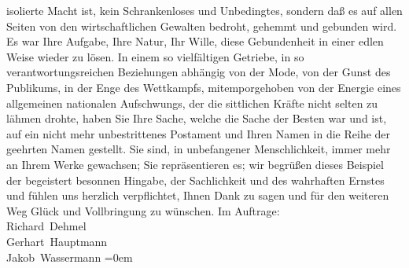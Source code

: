 \begin{ledgroupsized}[t]{13cm}
               isolierte Macht ist, kein Schrankenloses und Unbedingtes, sondern daß es auf allen
               Seiten von den wirtschaftlichen Gewalten bedroht, gehemmt und gebunden wird. Es war
               Ihre Aufgabe, Ihre Natur, Ihr Wille, {\pb}diese Gebundenheit in einer edlen Weise wieder zu lösen. In einem so vielfältigen
               Getriebe, in so verantwortungsreichen Beziehungen abhängig von der Mode, von der
               Gunst des Publikums, in der Enge des Wettkampfs, mitemporgehoben von der Energie
               eines allgemeinen nationalen Aufschwungs, der die sittlichen Kräfte nicht selten zu
               lähmen drohte, haben Sie Ihre Sache, welche die Sache der Besten war und ist, auf ein
               nicht mehr unbestrittenes Postament und Ihren Namen in die Reihe der geehrten Namen
               gestellt. Sie sind, in unbefangener Menschlichkeit, immer mehr an Ihrem Werke
               gewachsen; Sie repräsentieren es; wir begrüßen dieses Beispiel der begeistert
               besonnen Hingabe, der Sachlichkeit und des wahrhaften Ernstes und fühlen uns herzlich
               verpflichtet, Ihnen Dank zu sagen und für den weiteren Weg Glück und Vollbringung zu
               wünschen.\pend
           \pstart
           Im Auftrage:{\\[\baselineskip]}\spacefill\mbox{Richard Dehmel}{\\[\baselineskip]}\spacefill\mbox{Gerhart Hauptmann}{\\[\baselineskip]}\spacefill\mbox{Jakob Wassermann}\pend
           \leftskip=0em{}
         
         \endnumbering{}\end{ledgroupsized}  \newcommand{\dateiname}{L01892}\newcommand{\titel}{Richard Dehmel, Gerhart Hauptmann und Jakob Wassermann an Arthur Schnitzler, 3. 12. 1909}\newcommand{\editorInnen}{Martin Anton Müller und Gerd-Hermann Susen}
      